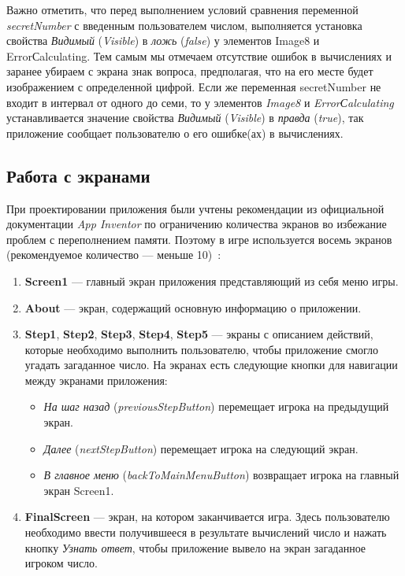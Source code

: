 Важно отметить, что перед выполнением условий сравнения переменной \textit{secretNumber} с введенным пользователем числом, выполняется установка свойства \textit{Видимый} (\textit{Visible}) в \textit{ложь} (\textit{false}) у элементов Image8 и ErrorСalculating.
Тем самым мы отмечаем отсутствие ошибок в вычислениях и заранее убираем с экрана знак вопроса, предполагая, что на его месте будет изображением с определенной цифрой. Если же переменная secretNumber не входит в интервал от одного до семи, то у элементов \textit{Image8} и \textit{ErrorСalculating} устанавливается значение свойства \textit{Видимый} (\textit{Visible}) в \textit{правда} (\textit{true}), 
так приложение сообщает пользователю о его ошибке(ах) в вычислениях.

\subsection{Работа с экранами}
При проектировании приложения были учтены рекомендации из официальной документации \textit{App Inventor} по ограничению количества экранов во избежание проблем с переполнением памяти.
Поэтому в игре используется восемь экранов (рекомендуемое количество — меньше 10)~\cite{MitManyScreens}:
\begin{enumerate}
\item \textbf{Screen1} — главный экран приложения представляющий из себя меню игры.
\item \textbf{About} — экран, содержащий основную информацию о приложении.
\item \textbf{Step1}, \textbf{Step2}, \textbf{Step3}, \textbf{Step4}, \textbf{Step5} — экраны с описанием действий, которые необходимо выполнить пользователю, чтобы приложение смогло угадать загаданное число. На экранах есть следующие кнопки для навигации между экранами приложения:
\begin{itemize}
  \item \textit{На шаг назад} (\textit{previousStepButton}) перемещает игрока на предыдущий экран.
  \item \textit{Далее} (\textit{nextStepButton}) перемещает игрока на следующий экран.
  \item \textit{В главное меню} (\textit{backToMainMenuButton}) возвращает игрока на главный экран Screen1.
\end{itemize}
\item \textbf{FinalScreen} — экран, на котором заканчивается игра. Здесь пользователю необходимо ввести получившееся в результате вычислений число и нажать кнопку \textit{Узнать ответ}, чтобы приложение вывело на экран загаданное игроком число.
\end{enumerate}

